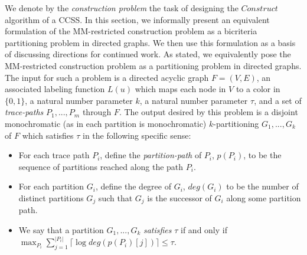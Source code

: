 \documentclass{article}
\theoremstyle{definition}
\begin{document}
We denote by the \textit{construction problem} the task of designing the 
$Construct$ algorithm of a CCSS.  In this section, we informally present an 
equivalent formulation of the MM-restricted construction problem as a bicriteria 
partitioning problem in directed graphs.  We then use this formulation as a 
basis of discussing directions for continued work.
\newline\newline
As stated, we equivalently pose the MM-restricted construction problem as a 
partitioning problem in directed graphs.  The input for such a problem is a 
directed acyclic graph $F=(V,E)$, an associated labeling function $L(u)$ which 
maps each node in $V$ to a color in $\{0,1\}$, a natural number parameter $k$, 
a natural number parameter $\tau$,  and a set of \textit{trace-paths} 
$P_1,...,P_m$ through $F$.  The output desired by this problem is a disjoint 
monochromatic (as in each partition is monochromatic) 
$k$-partitioning $G_1,...,G_k$ of $F$ which satisfies $\tau$ in the following specific sense:

\begin{itemize}
\item{For each trace path $P_i$, define the \textit{partition-path} of 
$P_i$, $p(P_i)$, to be the sequence of partitions reached along the path $P_i$.}
\item{For each partition $G_i$, define the degree of $G_i$, $deg(G_i)$ to be the 
number of distinct partitions $G_j$ such that $G_j$ is the successor of $G_i$ 
along some partition path.}
\item{We say that a partition $G_1,...,G_k$ \textit{satisfies} $\tau$ if 
and only if 
$\max_{P_i} \sum_{j=1}^{\lvert P_i \rvert} \lceil \log{deg(p(P_i)[j])} \rceil \leq \tau$.}
\end{itemize}  
\end{document}
